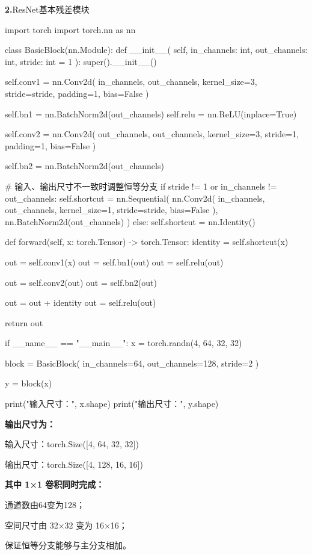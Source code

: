 \documentclass[UTF8,openany,oneside,zihao=-4,fontset=windows]{ctexbook}
\newcommand{\Question}[2]{%
  \par\Needspace{4\baselineskip}\medskip
  \noindent\textbf{\color{MVBlue}#1}\quad #2\par
}
\begin{document}
\Question{2.}{ResNet基本残差模块}
\begin{CodeBlock}
import torch
import torch.nn as nn

class BasicBlock(nn.Module):
    def __init__(
        self,
        in_channels: int,
        out_channels: int,
        stride: int = 1
    ):
        super().__init__()

        self.conv1 = nn.Conv2d(
            in_channels,
            out_channels,
            kernel_size=3,
            stride=stride,
            padding=1,
            bias=False
        )

        self.bn1 = nn.BatchNorm2d(out_channels)
        self.relu = nn.ReLU(inplace=True)

        self.conv2 = nn.Conv2d(
            out_channels,
            out_channels,
            kernel_size=3,
            stride=1,
            padding=1,
            bias=False
        )

        self.bn2 = nn.BatchNorm2d(out_channels)

        # 输入、输出尺寸不一致时调整恒等分支
        if stride != 1 or in_channels != out_channels:
            self.shortcut = nn.Sequential(
                nn.Conv2d(
                    in_channels,
                    out_channels,
                    kernel_size=1,
                    stride=stride,
                    bias=False
                ),
                nn.BatchNorm2d(out_channels)
            )
        else:
            self.shortcut = nn.Identity()

    def forward(self, x: torch.Tensor) -> torch.Tensor:
        identity = self.shortcut(x)

        out = self.conv1(x)
        out = self.bn1(out)
        out = self.relu(out)

        out = self.conv2(out)
        out = self.bn2(out)

        out = out + identity
        out = self.relu(out)

        return out

if __name__ == "__main__":
    x = torch.randn(4, 64, 32, 32)

    block = BasicBlock(
        in_channels=64,
        out_channels=128,
        stride=2
    )

    y = block(x)

    print("输入尺寸：", x.shape)
    print("输出尺寸：", y.shape)
\end{CodeBlock}
\par\noindent\textbf{输出尺寸为：}
\par 输入尺寸：torch.Size([4, 64, 32, 32])
\par 输出尺寸：torch.Size([4, 128, 16, 16])
\par\noindent\textbf{其中 1×1 卷积同时完成：}
\par\noindent\textbullet\quad 通道数由64变为128；
\par\noindent\textbullet\quad 空间尺寸由 32×32 变为 16×16；
\par 保证恒等分支能够与主分支相加。
\fi
\end{document}
